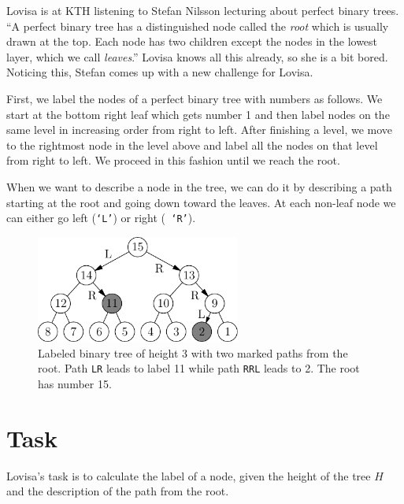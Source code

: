 

\noindent
Lovisa is at KTH listening to Stefan Nilsson lecturing about perfect binary trees. ``A perfect binary
tree has a distinguished node called the \emph{root} which is usually drawn at the top. Each node
has two children except the nodes in the lowest layer, which we call \emph{leaves}.'' Lovisa 
knows all this already, so she is a bit bored.  Noticing this, Stefan comes up with a new challenge for Lovisa.

First, we label the nodes of a perfect binary tree with numbers as follows. We start at the bottom
right leaf which gets number 1 and then label nodes on the same level in increasing order from right
to left. After finishing a level, we move to the rightmost node in the level above and label all the
nodes on that level from right to left. We proceed in this fashion until we reach the root.

When we want to describe a node in the tree, we can do it by describing a path starting at the root
and going down toward the leaves. At each non-leaf node we can either go left ({\tt `L'}) or right ({\tt
`R'}).

\begin{figure}[h]
    \begin{center}
    \includegraphics[width=0.6\textwidth]{tree}
    \caption{Labeled binary tree of height 3 with two marked paths from the root. Path {\tt LR}
      leads to label 11 while path {\tt RRL} leads to 2. The root has number 15.}
    \end{center}
\end{figure}

\section*{Task}
Lovisa's task is to calculate the label of a node, given the height of the tree $H$ and the
description of the path from the root.

